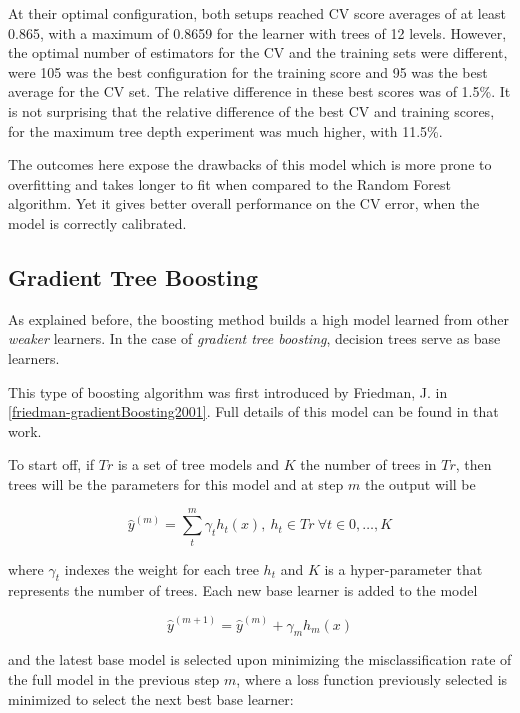 At their optimal configuration, both setups reached CV score averages of at least 0.865, with a maximum of 0.8659 for the learner with trees of 12 levels.
However, the optimal number of estimators for the CV and the training sets were different, were 105 was the best configuration for the training score and 95 was the best average for the CV set. The relative difference in these best scores was of 1.5\%.
It is not surprising that the relative difference of the best CV and training scores, for the maximum tree depth experiment was much higher, with 11.5\%.

The outcomes here expose the drawbacks of this model which is more prone to overfitting and takes longer to fit when compared to the Random Forest algorithm.
Yet it gives better overall performance on the CV error, when the model is correctly calibrated.



\subsection{Gradient Tree Boosting}

As explained before, the boosting method builds a high model learned from other \textit{weaker} learners. 
In the case of \textit{gradient tree boosting}, decision trees serve as base learners. 

This type of boosting algorithm was first introduced by Friedman, J. in \cref{friedman-gradientBoosting2001}. 
Full details of this model can be found in that work.


To start off, if $Tr$ is a set of tree models and $K$ the number of trees in $Tr$, then trees will be the parameters for this model and at step $m$ the output will be

\begin{equation}
\hat{y}^{(m)}= \sum_t^m \gamma_t h_t(x) , \ h_t \in Tr \ \forall t \in {0,\ldots,K}
\end{equation}

where $\gamma_t$ indexes the weight for each tree $h_t$ and $K$ is a hyper-parameter that represents the number of trees. 
Each new base learner is added to the model

\begin{equation}
\hat{y}^{(m+1)} =  \hat{y}^{(m)} + \gamma_m h_m(x)
\end{equation}

and the latest base model is selected upon minimizing the misclassification rate of the full model in the previous step $m$, where a loss function previously selected is minimized to select the next best base learner:

